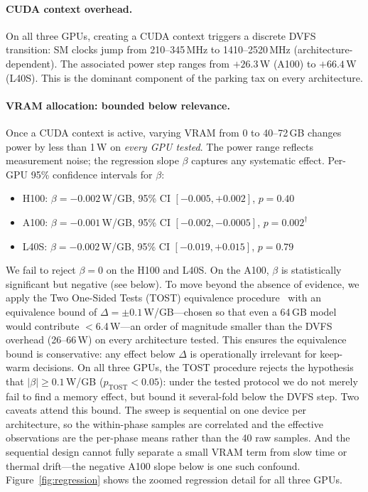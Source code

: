 \documentclass[sigconf,nonacm]{acmart}
\begin{document}
\paragraph{CUDA context overhead.} On all three GPUs, creating a CUDA context triggers a discrete DVFS transition: SM clocks jump from 210--345\,MHz to 1410--2520\,MHz (architecture-dependent). The associated power step ranges from $+26.3$\,W (A100) to $+66.4$\,W (L40S). This is the dominant component of the parking tax on every architecture.

\paragraph{VRAM allocation: bounded below relevance.} Once a CUDA context is active, varying VRAM from 0 to 40--72\,GB changes power by less than 1\,W on \emph{every GPU tested}. The power range reflects measurement noise; the regression slope $\beta$ captures any systematic effect. Per-GPU 95\% confidence intervals for $\beta$:
\begin{itemize}
    \item H100: $\beta = -0.002$\,W/GB, 95\% CI $[-0.005, +0.002]$, $p = 0.40$
    \item A100: $\beta = -0.001$\,W/GB, 95\% CI $[-0.002, -0.0005]$, $p = 0.002^\dagger$
    \item L40S: $\beta = -0.002$\,W/GB, 95\% CI $[-0.019, +0.015]$, $p = 0.79$
\end{itemize}
We fail to reject $\beta = 0$ on the H100 and L40S. On the A100, $\beta$ is statistically significant but negative (see below). To move beyond the absence of evidence, we apply the Two One-Sided Tests (TOST) equivalence procedure~\cite{schuirmann-tost} with an equivalence bound of $\Delta = \pm 0.1$\,W/GB---chosen so that even a 64\,GB model would contribute $<$6.4\,W---an order of magnitude smaller than the DVFS overhead (26--66\,W) on every architecture tested. This ensures the equivalence bound is conservative: any effect below $\Delta$ is operationally irrelevant for keep-warm decisions. On all three GPUs, the TOST procedure rejects the hypothesis that $|\beta| \geq 0.1$\,W/GB ($p_{\text{TOST}} < 0.05$): under the tested protocol we do not merely fail to find a memory effect, but bound it several-fold below the DVFS step. Two caveats attend this bound. The sweep is sequential on one device per architecture, so the within-phase samples are correlated and the effective observations are the per-phase means rather than the 40 raw samples. And the sequential design cannot fully separate a small VRAM term from slow time or thermal drift---the negative A100 slope below is one such confound. Figure~\ref{fig:regression} shows the zoomed regression detail for all three GPUs.
\end{document}
